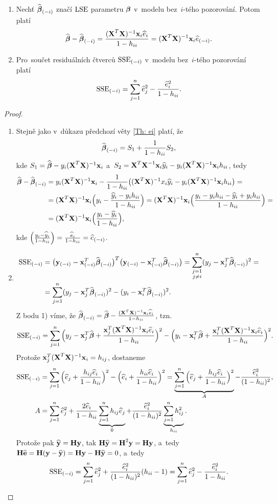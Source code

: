 \begin{theorem}
	\begin{enumerate}[1)]
		\item Nechť $\mini{\wbetab}$ značí $\LSE$ parametru $\betab$ v~modelu bez~$i$-tého pozorování. Potom platí
	 $$ \wbetab-\mini{\wbetab} = \frac{(\textbf{X}^T\textbf{X})^{-1}\x_i\hei}{1-\hii} = (\textbf{X}^T\textbf{X})^{-1}\x_i\mini{\he}. $$
	\item Pro~součet residuálních čtverců $\mini{\SSE}$ v~modelu bez~$i$-tého pozorování platí
	 $$ \mini{\SSE} = \sumjn \he_j^2-\frac{\he_i^2}{1-\hii}. $$
	\end{enumerate}

\begin{proof}
	\begin{enumerate}[1)]
		\item Stejně jako v~důkazu předchozí věty \ref{Th: ei} platí, že
		 $$ \mini{\wbetab} = S_1+\frac{1}{1-\hii}S_2, $$
		kde $S_1 = \wbetab-y_i\inv{(\textbf{X}^T\textbf{X})}\x_i$ a~$S_2 = \inv{\textbf{X}^T\textbf{X}}\x_i\hyi-y_i\core \x_i\hii$, tedy
		\[
		\begin{split}
		\wbetab-\mini{\wbetab}& = y_i\core\x_i-\frac{1}{1-\hii}\big(\core x_i\hyi-y_i\core \x_i\hii\big) = \\& = \core \x_i\Big(y_i-\frac{\hyi-y_i\hii}{1-\hii}\Big) = \core \x_i\Big(\frac{y_i-y_i\hii-\hyi+y_i\hii}{1-\hii}\Big) = \\& = \core \x_i\Big(\frac{y_i-\hyi}{1-\hii}\Big),
		\end{split}
		\]
		kde $\Big(\frac{y_i-\hyi}{1-\hii}\Big) = \frac{\hei}{1-\hii} = \mini{\he}$.
		\item \[
		\begin{split}
		\mini{\SSE}& = \big(\mini{\y}-\mini{\x}^T\mini{\wbetab}\big)^T\big(\mini{\y}-\mini{\x}^T\mini{\wbetab}\big) = \sum_{\substack{j = 1\\j\neq i}}^n(y_j-\x_j^T\mini{\wbetab})^2 = \\& = \sumjn (y_j-\x_j^T\mini{\wbetab})^2-(y_i-\x_i^T\mini{\wbetab})^2.
		\end{split}
		\]
		Z bodu 1) víme, že $\mini{\wbetab} = \wbetab-\frac{\core \x_i\hei}{1-\hii}$, tzn.
		 $$ \mini{\SSE} = \sumjn\Big(y_j-\x_j^T\wbetab+\frac{\x_j^T\core \x_i\hei}{1-\hii}\Big)^2-\Big(y_i-\x_i^T\wbetab+\frac{\x_i^T\core \x_i\hei}{1-\hii}\Big)^2. $$
		Protože $\x_j^T\core \x_i = h_{ij}$, dostaneme
		\[
	\begin{split}
	\mini{\SSE}& = \sumjn \Big(\he_j+\frac{h_{ij}\hei}{1-\hii}\Big)^2-\Big(\he_i+\frac{h_{ii}\hei}{1-\hii}\Big)^2 = \underbrace{\sumjn\Big(\he_j+\frac{h_{ij}\hei}{1-\hii}\Big)^2}_A-\frac{\hei^2}{(1-\hii)^2},\\
	A& = \sumjn \he_j^2+\frac{2\hei}{1-\hii}\underbrace{\sumjn h_{ij}\he_j}_0+\frac{\hei^2}{(1-\hii)^2}\underbrace{\sumjn h_{ij}^2}_{\hii}.
	\end{split}
	\]
		Protože pak $\hyb = \Hm\y$, tak $\Hm\hyb = \Hm^2\y = \Hm\y$, a~tedy $\Hm\heb = \Hm(\y-\hyb) = \Hm\y-\Hm\hyb = 0$, a~tedy
		 $$ \mini{\SSE} = \sumjn\he_j^2+\frac{\hei^2}{(1-\hii)^2}(\hii-1) = \sumjn\he_j^2-\frac{\hei^2}{1-\hii}. $$
	\end{enumerate}
\end{proof}
\end{theorem}

